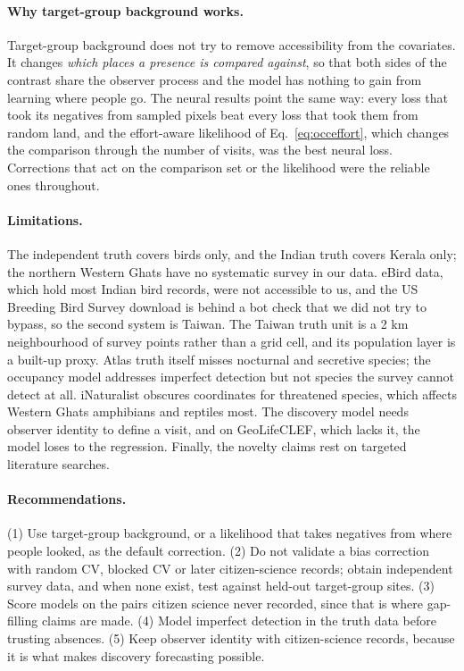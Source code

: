 \documentclass[11pt]{article}
\begin{document}
\paragraph{Why target-group background works.} Target-group background does not try to remove accessibility from the covariates. It changes \emph{which places a presence is compared against}, so that both sides of the contrast share the observer process and the model has nothing to gain from learning where people go. The neural results point the same way: every loss that took its negatives from sampled pixels beat every loss that took them from random land, and the effort-aware likelihood of Eq.~\ref{eq:occeffort}, which changes the comparison through the number of visits, was the best neural loss. Corrections that act on the comparison set or the likelihood were the reliable ones throughout.

\paragraph{Limitations.} The independent truth covers birds only, and the Indian truth covers Kerala only; the northern Western Ghats have no systematic survey in our data. eBird data, which hold most Indian bird records, were not accessible to us, and the US Breeding Bird Survey download is behind a bot check that we did not try to bypass, so the second system is Taiwan. The Taiwan truth unit is a 2 km neighbourhood of survey points rather than a grid cell, and its population layer is a built-up proxy. Atlas truth itself misses nocturnal and secretive species; the occupancy model addresses imperfect detection but not species the survey cannot detect at all. iNaturalist obscures coordinates for threatened species, which affects Western Ghats amphibians and reptiles most. The discovery model needs observer identity to define a visit, and on GeoLifeCLEF, which lacks it, the model loses to the regression. Finally, the novelty claims rest on targeted literature searches.

\paragraph{Recommendations.} (1) Use target-group background, or a likelihood that takes negatives from where people looked, as the default correction. (2) Do not validate a bias correction with random CV, blocked CV or later citizen-science records; obtain independent survey data, and when none exist, test against held-out target-group sites. (3) Score models on the pairs citizen science never recorded, since that is where gap-filling claims are made. (4) Model imperfect detection in the truth data before trusting absences. (5) Keep observer identity with citizen-science records, because it is what makes discovery forecasting possible.
\end{document}
